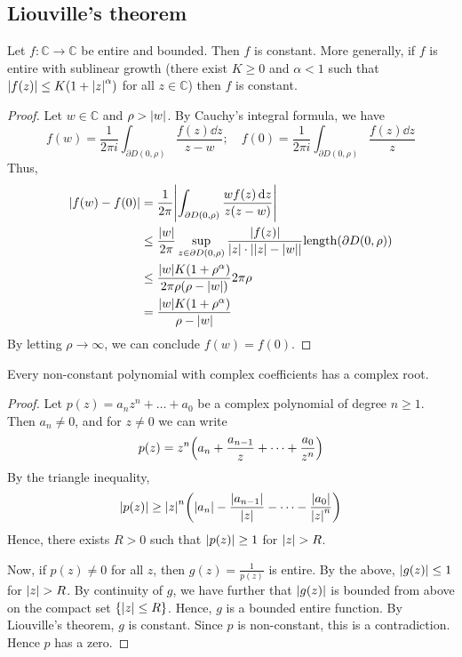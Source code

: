 \subsection{Liouville's theorem}
\begin{theorem}
	Let \( f \colon \mathbb C \to \mathbb C \) be entire and bounded.
	Then \( f \) is constant.
	More generally, if \( f \) is entire with sublinear growth (there exist \( K \geq 0 \) and \( \alpha < 1 \) such that \( \abs{f(z)} \leq K(1+\abs{z}^\alpha) \) for all \( z \in \mathbb C \)) then \( f \) is constant.
\end{theorem}
\begin{proof}
	Let \( w \in \mathbb C \) and \( \rho > \abs{w} \).
	By Cauchy's integral formula, we have
	\[ f(w) = \frac{1}{2 \pi i} \int_{\partial D(0,\rho)} \frac{f(z)\dd{z}}{z-w};\quad f(0) = \frac{1}{2 \pi i} \int_{\partial D(0,\rho)} \frac{f(z) \dd{z}}{z} \]
	Thus,
	\begin{align*}
		\abs{f(w) - f(0)} &= \frac{1}{2\pi} \abs{\int_{\partial D(0,\rho)} \frac{wf(z) \dd{z}}{z(z-w)}} \\
		&\leq \frac{\abs{w}}{2 \pi} \sup_{z \in \partial D(0,\rho)} \frac{\abs{f(z)}}{\abs{z} \cdot \abs{\abs{z} - \abs{w}}} \mathrm{length}(\partial D(0,\rho)) \\
		&\leq \frac{\abs{w} K(1+\rho^\alpha)}{2\pi \rho(\rho - \abs{w})} 2 \pi \rho \\
		&= \frac{\abs{w}K(1+\rho^\alpha)}{\rho - \abs{w}}
	\end{align*}
	By letting \( \rho \to \infty \), we can conclude \( f(w) = f(0 )\).
\end{proof}
\begin{theorem}
	Every non-constant polynomial with complex coefficients has a complex root.
\end{theorem}
\begin{proof}
	Let \( p(z) = a_n z^n + \dots + a_0 \) be a complex polynomial of degree \( n \geq 1 \).
	Then \( a_n \neq 0 \), and for \( z \neq 0 \) we can write
	\[ p(z) = z^n \qty(a_n + \frac{a_{n-1}}{z} + \dots + \frac{a_0}{z^n} ) \]
	By the triangle inequality,
	\[ \abs{p(z)} \geq \abs{z}^n \qty(\abs{a_n} - \frac{\abs{a_{n-1}}}{\abs{z}} - \dots - \frac{\abs{a_0}}{\abs{z}^n}) \]
	Hence, there exists \( R > 0 \) such that \( \abs{p(z)} \geq 1 \) for \( \abs{z} > R \).

	Now, if \( p(z) \neq 0 \) for all \( z \), then \( g(z) = \frac{1}{p(z)} \) is entire.
	By the above, \( \abs{g(z)} \leq 1 \) for \( \abs{z} > R \).
	By continuity of \( g \), we have further that \( \abs{g(z)} \) is bounded from above on the compact set \( \qty{\abs{z} \leq R} \).
	Hence, \( g \) is a bounded entire function.
	By Liouville's theorem, \( g \) is constant.
	Since \( p \) is non-constant, this is a contradiction.
	Hence \( p \) has a zero.
\end{proof}
